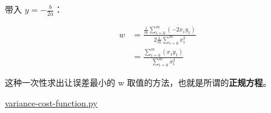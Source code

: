 带入 $y = -\frac{b}{2a}$：

\[
	\begin{aligned}
		w & = \frac {
			\frac{1}{m} \sum\limits^{m}_{i = 0} (-2x_1y_1)
		}{
			2\frac{1}{m} \sum\limits^{m}_{i = 0} x_1^2
		}             \\
		  & = \frac {
			\sum\limits^{m}_{i = 0} (x_1y_1)
		} {
			\sum\limits^{m}_{i = 0} x_1^2
		}
	\end{aligned}
\]

这种一次性求出让误差最小的 w 取值的方法，也就是所谓的\textbf{正规方程}。

\url{variance-cost-function.py}


